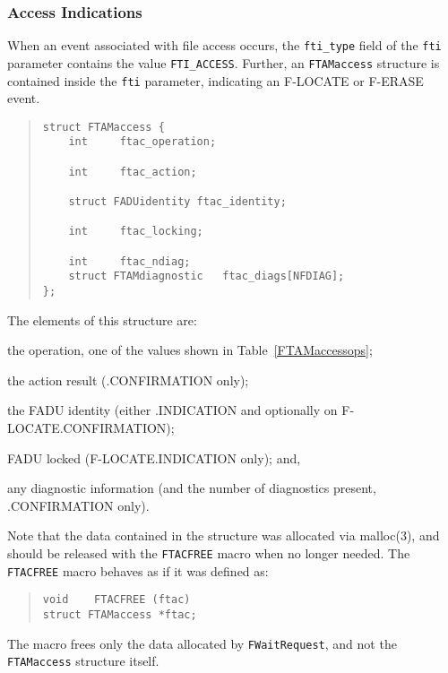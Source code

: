 \subsubsection	{Access Indications}
When an event associated with file access occurs,
the \verb"fti_type" field of the \verb"fti" parameter contains the value
\verb"FTI_ACCESS".
Further,
an \verb"FTAMaccess" structure is contained inside the \verb"fti" parameter,
indicating an {\sf F-LOCATE\/} or {\sf F-ERASE\/} event.
\begin{quote}\small\begin{verbatim}
struct FTAMaccess {
    int	    ftac_operation;

    int	    ftac_action;

    struct FADUidentity ftac_identity;

    int     ftac_locking;

    int     ftac_ndiag;
    struct FTAMdiagnostic   ftac_diags[NFDIAG];
};
\end{verbatim}\end{quote}
The elements of this structure are:
\begin{describe}
\item[\verb"ftac\_operation":] the operation,
one of the values shown in Table~\ref{FTAMaccessops};

\item[\verb"ftac\_action":] the action result ({\sf .CONFIRMATION\/} only);

\item[\verb"ftac\_identity":] the FADU identity
(either {\sf .INDICATION\/} and optionally on {\sf F-LOCATE.CONFIRMATION\/});

\item[\verb"ftac\_locking":] FADU locked ({\sf F-LOCATE.INDICATION\/} only);
and,

\item[\verb"ftac\_diags"/\verb"ftac\_ndiag":] any diagnostic information
(and the number of diagnostics present, {\sf .CONFIRMATION\/} only).
\end{describe}
Note that the data contained in the structure was allocated via \man malloc(3),
and should be released with the \verb"FTACFREE" macro when no longer needed.
The \verb"FTACFREE" macro
behaves as if it was defined as:
\begin{quote}\small\begin{verbatim}
void    FTACFREE (ftac)
struct FTAMaccess *ftac;
\end{verbatim}\end{quote}
The macro frees only the data allocated by \verb"FWaitRequest",
and not the \verb"FTAMaccess" structure itself.


